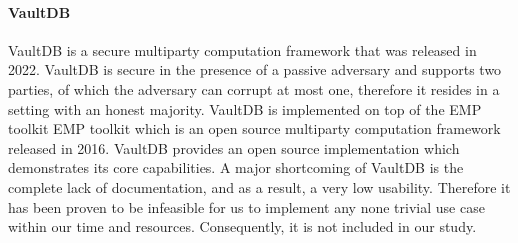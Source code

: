 \paragraph{VaultDB} 
VaultDB \cite{rogers2022vaultdb} is a secure multiparty computation framework that was released in 2022. VaultDB is secure in the presence of a passive adversary and supports two parties, of which the adversary can corrupt at most one, therefore it resides in a setting with an honest majority. VaultDB is implemented on top of the EMP toolkit EMP toolkit \cite{emp-toolkit} which is an open source multiparty computation framework released in 2016. VaultDB provides an open source implementation which demonstrates its core capabilities.
A major shortcoming of VaultDB is the complete lack of documentation, and as a result, a very low usability. Therefore it has been proven to be infeasible for us to implement any none trivial use case within our time and resources. Consequently, it is not included in our study.

 